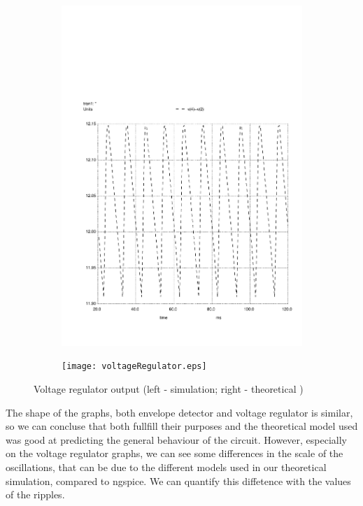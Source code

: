 \begin{figure}[h]
    \centering
    \begin{subfigure}{0.23\textwidth}
        \includegraphics[width=\linewidth, clip]{solution1.pdf}
        \label{fig:voltr1}
    \end{subfigure}
    \begin{subfigure}{0.23\textwidth}
        \texttt{[image: voltageRegulator.eps]}
        \label{fig:voltr2}
    \end{subfigure}
    \caption{\small Voltage regulator output (left - simulation; right - theoretical )}
    \label{volt_reg}
\end{figure}

The shape of the graphs, both envelope detector and voltage regulator is similar, so we can concluse that both fullfill their purposes and the theoretical model used was good at predicting the general behaviour of the circuit. 
However, especially on the voltage regulator graphs, we can see some differences in the scale of the oscillations, that can be due to the different models used in our theoretical simulation, compared to ngspice.
We can quantify this diffetence with the values of the ripples. 


